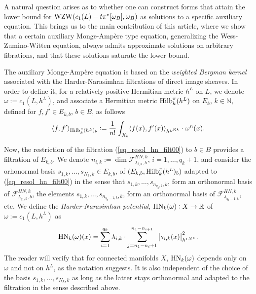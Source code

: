 \documentclass[12pt]{article}
\numberwithin{equation}{section}
\theoremstyle{theorem}
\theoremstyle{definition}
\theoremstyle{remark}
\newcommand{\real}{\mathbb{R}}
\newcommand{\nat}{\mathbb{N}}
\newcommand{\scal}[2]{\langle #1, #2 \rangle}
\begin{document}
	\par 
	A natural question arises as to whether one can construct forms that attain the lower bound for ${\rm{WZW}}(c_1(L) - t \pi^* [\omega_B], \omega_B)$ as solutions to a specific auxiliary equation.
	This brings us to the main contribution of this article, where we show that a certain auxiliary Monge-Ampère type equation, generalizing the Wess-Zumino-Witten equation, always admits approximate solutions on arbitrary fibrations, and that these solutions saturate the lower bound.
	\par 
	The auxiliary Monge-Ampère equation is based on the \textit{weighted Bergman kernel} associated with the Harder-Narasimhan filtrations of direct image sheaves.
	In order to define it, for a relatively positive Hermitian metric $h^L$ on $L$, we denote $\omega := c_1(L, h^L)$, and associate a Hermitian metric ${\rm{Hilb}}_k^{\pi}(h^L)$ on $E_k$, $k \in \nat$, defined for $f, f' \in E_{k, b}$, $b \in B$, as follows
	\begin{equation}\label{eq_l2_prod}
		\scal{f}{f'}_{{\rm{Hilb}}_k^{\pi}(h^L)_b} := \frac{1}{n!} \int_{X_b} \scal{f(x)}{f'(x)}_{h^{L^{\otimes k}}} \cdot \omega^n(x).
	\end{equation}
	\par 
	Now, the restriction of the filtration (\ref{eq_resol_hn_filt00}) to $b \in B$ provides a filtration of $E_{k, b}$.
	We denote $n_{i, k} := \dim \mathcal{F}^{HN, k}_{\lambda_{i, k}, b}$, $i = 1, \ldots, q_k + 1$, and consider the orhonormal basis $s_{1, k}, \ldots, s_{N_k, k} \in E_{k, b}$, of $(E_{k, b}, {\rm{Hilb}}_k^{\pi}(h^L)_b)$ adapted to (\ref{eq_resol_hn_filt00}) in the sense that $s_{1, k}, \ldots, s_{n_{q_k, k}, k}$, form an orthonormal basis of $\mathcal{F}^{HN, k}_{\lambda_{q_k, k}, b}$, the elements $s_{1, k}, \ldots, s_{n_{q_k - 1, k}, k}$, form an orthonormal basis of $\mathcal{F}^{HN, k}_{\lambda_{q_k - 1, k}}$, etc. 
	We define the \textit{Harder-Narasimhan potential}, ${\rm{HN}}_k(\omega) : X \to \real$ of $\omega := c_1(L, h^L)$ as
	\begin{equation}\label{eq_hn_potent}
		{\rm{HN}}_k(\omega)(x)
		=
		\sum_{i = 1}^{q_k} \lambda_{i, k} \cdot \sum_{j = n_1 - n_i + 1}^{n_1 - n_{i + 1}} \big| s_{i, k}(x) \big|^2_{h^{L^{\otimes k}}}.
	\end{equation}
	The reader will verify that for connected manifolds $X$, ${\rm{HN}}_k(\omega)$ depends only on $\omega$ and not on $h^L$, as the notation suggests. 
	It is also independent of the choice of the basis $s_{1, k}, \ldots, s_{N_k, k}$ as long as the latter stays orthonormal and adapted to the filtration in the sense described above.
\end{document}
